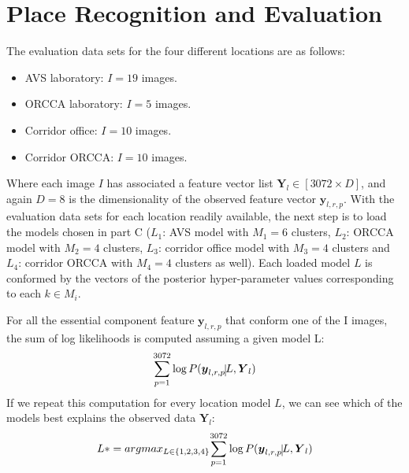 \newpage\newpage
\section{Place Recognition and Evaluation}
The evaluation data sets for the four different locations are as follows:
\begin{itemize}
	\item{AVS laboratory:}
	$I = 19$ images.
	\item{ORCCA laboratory: }
	$I = 5$ images.
	\item{Corridor office: }
	$I = 10$ images.
	\item{Corridor ORCCA: }
	$I = 10$ images.
\end{itemize}

Where each image $I$ has associated a feature vector list $\bm{Y}_l \in [3072 \times D]$, 
and again $D=8$ is the dimensionality of the observed feature vector $\bm{y}_{l,r,p}$. 
With the evaluation data sets for each location readily available, 
the next step is to load the models chosen in part C 
($L_1$: AVS model with $M_1 = 6$ clusters,  
$L_2$: ORCCA model with $M_2 = 4$ clusters, 
$L_3$: corridor office model with $M_3 = 4$ clusters  and 
$L_4$: corridor ORCCA with $M_4 = 4$ clusters as well). 
Each loaded model $L$ is conformed by the vectors of the posterior hyper-parameter values 
corresponding to each $k \in M_i$.

For all the essential component feature $\bm{y}_{l,r,p}$ that conform one of the I images, 
the sum of log likelihoods is computed assuming a given model L:  
\begin{equation}
{\sum\limits_{p=1}^{3072} \log P( {\bm{y}_{l,r,p} \vline L}, \bm{Y}_l)}
\end{equation}
If we repeat this computation for every location model $L$, 
we can see which of the models best explains the observed data $\bm{Y}_l$: 
\begin{equation}
L* = argmax_{L \in \{1,2,3,4\}} {\sum\limits_{p=1}^{3072} \log P( {\bm{y}_{l,r,p} \vline L}, \bm{Y}_l)}
\end{equation}

